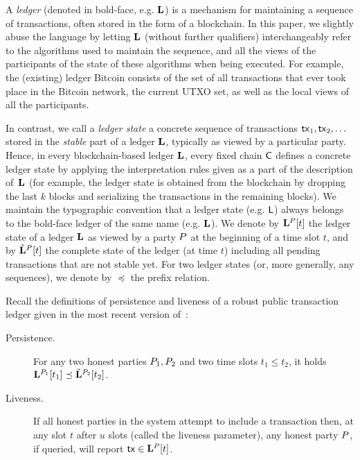 A \emph{ledger} (denoted in bold-face, e.g. $\mathbf{L}$) is a mechanism for
maintaining a sequence of transactions, often stored in the form of a
blockchain.  In this paper, we slightly abuse the language by letting $\mathbf{L}$
(without further qualifiers) interchangeably refer to the algorithms used to
maintain the sequence, and all the views of the participants of the state of
these algorithms when being executed.  For example, the (existing) ledger
Bitcoin consists of the set of all transactions that ever took place in the
Bitcoin network, %
the current UTXO set, as well as the
local views of all the participants.

In contrast, we call a \emph{ledger state}
a concrete sequence of transactions
$\mathsf{tx}_1,\mathsf{tx}_2, \ldots$ stored in the \emph{stable} part of a ledger $\mathbf{L}$, typically as viewed by a
particular party.
Hence, in every blockchain-based ledger $\mathbf{L}$, every fixed
chain $\mathsf{C}$ defines a concrete ledger state %
by applying  the interpretation rules given as a part of the description
of~$\mathbf{L}$ (for example, the ledger state is obtained from the
blockchain by dropping the last $k$ blocks and serializing the transactions in
the remaining blocks).
We maintain the typographic convention that a ledger state (e.g. $\mathsf{L}$) always
belongs to the bold-face ledger of the same name (e.g. $\mathbf{L}$).
We denote by $\mathbf{L}^{P}[t]$ the ledger state of a ledger $\mathbf{L}$ as viewed by a party
$P$ at the beginning of a time slot $t$,
and by $\check{\mathbf{L}}^P[t]$ the complete state of the ledger (at time
$t$) including all
pending transactions that are not stable yet.
For two ledger states (or, more generally, any sequences), we denote by
$\preceq$ the prefix relation.

Recall the definitions of persistence and liveness of a robust public
transaction ledger given in the most recent version of~\cite{EC:GarKiaLeo15}:

\begin{description}
  \item[Persistence.]
    For any two honest parties $P_1,P_2$ and two time slots $t_1\leq t_2$,
    it holds  $\mathbf{L}^{P_1}[t_1] \preceq
    \check{\mathbf{L}}^{P_2}[t_2]$.

  \item[Liveness.]
    If all honest parties in the system attempt to include a  transaction
    then, at any slot $t$ after $u$ slots (called the
    liveness parameter), any honest party $P$, if queried,
    will report $\mathsf{tx} \in \mathbf{L}^{P}[t]$.
\end{description}

